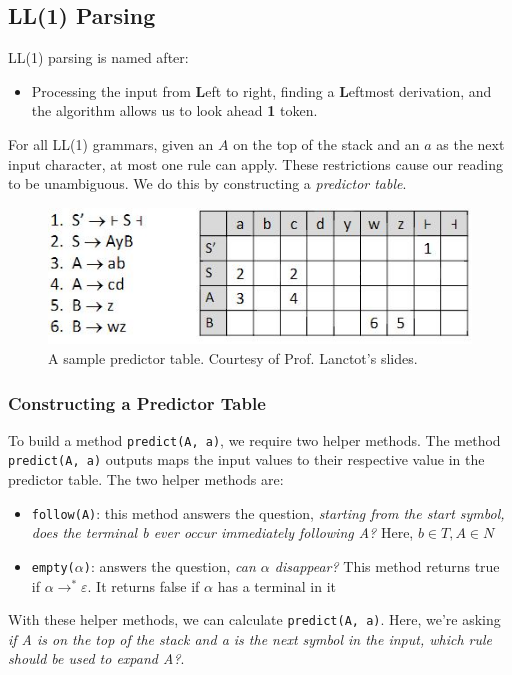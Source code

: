 \documentclass{report}
\begin{document}
\subsection{LL(1) Parsing}
LL(1) parsing is named after:
\begin{itemize}
\item Processing the input from \textbf{L}eft to right, finding a \textbf{L}eftmost derivation, and the algorithm allows us to look ahead \textbf{1} token.
\end{itemize}
For all LL(1) grammars, given an $A$ on the top of the stack and an $a$ as the next input character, at most one rule can apply. These restrictions cause our reading to be unambiguous. We do this by constructing a \textit{predictor table}.
\begin{figure}[ht]
\begin{center}
\includegraphics[scale=0.9]{predict.jpg}
\end{center}
\caption{A sample predictor table. Courtesy of Prof. Lanctot's slides.}
\end{figure}
\subsubsection{Constructing a Predictor Table}
To build a method \texttt{predict(A, a)}, we require two helper methods. The method \texttt{predict(A, a)} outputs maps the input values to their respective value in the predictor table. The two helper methods are:
\begin{itemize}
\item \texttt{follow(A)}: this method answers the question, \textit{starting from the start symbol, does the terminal b ever occur immediately following A?} Here, $b \in T, A \in N$
\item \texttt{empty($\alpha$)}: answers the question, \textit{can $\alpha$ disappear?} This method returns true if $\alpha \rightarrow^* \varepsilon$. It returns false if $\alpha$ has a terminal in it
\end{itemize}
With these helper methods, we can calculate \texttt{predict(A, a)}. Here, we're asking \textit{if A is on the top of the stack and a is the next symbol in the input, which rule should be used to expand A?}.
\end{document}
